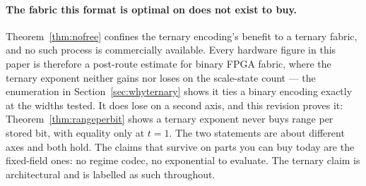 \documentclass[11pt]{article}
\theoremstyle{definition}
\begin{document}
\paragraph{The fabric this format is optimal on does not exist to buy.}
Theorem~\ref{thm:nofree} confines the ternary encoding's benefit to a ternary
fabric, and no such process is commercially available. Every hardware figure in
this paper is therefore a post-route estimate for binary FPGA fabric, where the
ternary exponent neither gains nor loses on the scale-state count --- the
enumeration in Section~\ref{sec:whyternary} shows it ties a binary encoding
exactly at the widths tested. It does lose on a second axis, and this revision
proves it: Theorem~\ref{thm:rangeperbit} shows a ternary exponent never buys range
per stored bit, with equality only at $t=1$. The two statements are about
different axes and both hold. The claims that survive on parts you can buy today are the fixed-field
ones: no regime codec, no exponential to
evaluate. The ternary claim is architectural and is labelled as such throughout.
\end{document}
